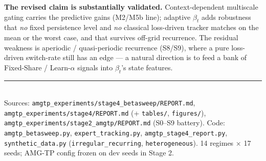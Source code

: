 \documentclass[11pt]{article}
\begin{document}
\noindent\textbf{The revised claim is substantially validated.}
Context-dependent multiscale gating carries the predictive gains (M2/M5b line);
adaptive $\beta_t$ adds robustness that \emph{no} fixed persistence level and
\emph{no} classical loss-driven tracker matches on the mean or the worst case,
and that survives off-grid recurrence. The residual weakness is aperiodic /
quasi-periodic recurrence (S8/S9), where a pure loss-driven switch-rate still has
an edge --- a natural direction is to feed a bank of Fixed-Share / Learn-$\alpha$
signals into $\beta_t$'s state features.

\vfill
\noindent\rule{\linewidth}{0.4pt}\\[2pt]
{\footnotesize Sources:
\texttt{amgtp\_experiments/stage4\_betasweep/REPORT.md},
\texttt{amgtp\_experiments/stage4/REPORT.md} (+ \texttt{tables/}, \texttt{figures/}),
\texttt{amgtp\_experiments/stage2\_amgtp/REPORT.md} (S0--S9 battery).
Code: \texttt{amgtp\_betasweep.py}, \texttt{expert\_tracking.py},
\texttt{amgtp\_stage4\_report.py}, \texttt{synthetic\_data.py}
(\texttt{irregular\_recurring}, \texttt{heterogeneous}). 14 regimes $\times$ 17
seeds; AMG-TP config frozen on dev seeds in Stage 2.}
\end{document}
